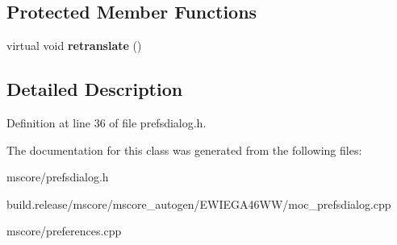 \subsection*{Protected Member Functions}
\begin{DoxyCompactItemize}
\item 
\mbox{\label{class_ms_1_1_preference_dialog_a080918aa617de1265dbeb6726a7eacc8}} 
virtual void {\bfseries retranslate} ()
\end{DoxyCompactItemize}


\subsection{Detailed Description}


Definition at line 36 of file prefsdialog.\+h.



The documentation for this class was generated from the following files\+:\begin{DoxyCompactItemize}
\item 
mscore/prefsdialog.\+h\item 
build.\+release/mscore/mscore\+\_\+autogen/\+E\+W\+I\+E\+G\+A46\+W\+W/moc\+\_\+prefsdialog.\+cpp\item 
mscore/preferences.\+cpp\end{DoxyCompactItemize}
